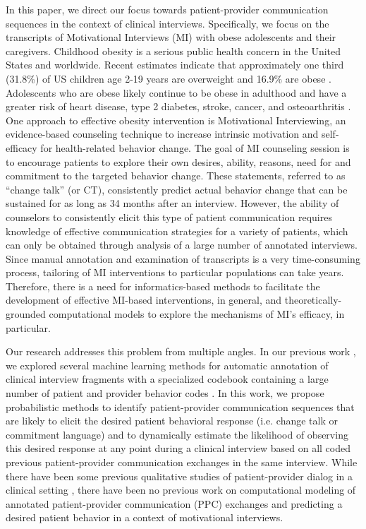 \documentclass{amia_summit_2018}
\begin{document}
In this paper, we direct our focus towards patient-provider communication sequences in the context of clinical interviews. Specifically, we focus on the transcripts of Motivational Interviews (MI) with obese adolescents and their caregivers. Childhood obesity is a serious public health concern in the United States and worldwide. Recent estimates indicate that approximately one third (31.8\%) of US children age 2-19 years are overweight and 16.9\% are obese \cite{ogden2012prevalence}. Adolescents who are obese likely continue to be obese in adulthood and have a greater risk of heart disease, type 2 diabetes, stroke, cancer, and osteoarthritis \cite{general2010surgeon}. One approach to effective obesity intervention is Motivational Interviewing, an evidence-based counseling technique to increase intrinsic motivation and self-efficacy for health-related behavior change. The goal of MI counseling session is to encourage patients to explore their own desires, ability, reasons, need for and commitment to the targeted behavior change. These statements, referred to as ``change talk'' (or CT), consistently predict actual behavior change that can be sustained for as long as 34 months after an interview. However, the ability of counselors to consistently elicit this type of patient communication requires knowledge of effective communication strategies for a variety of patients, which can only be obtained through analysis of a large number of annotated interviews. Since manual annotation and examination of transcripts is a very time-consuming process, tailoring of MI interventions to particular populations can take years. Therefore, there is a need for informatics-based methods to facilitate the development of effective MI-based interventions, in general, and theoretically-grounded computational models to explore the mechanisms of MI's efficacy, in particular.  

Our research addresses this problem from multiple angles. In our previous work \cite{kotov2015interpretable, hasan2016study}, we explored several machine learning methods for automatic annotation of clinical interview fragments with a specialized codebook containing a large number of patient and provider behavior codes \cite{carcone2013provider}. In this work, we propose probabilistic methods to identify patient-provider communication sequences that are likely to elicit the desired patient behavioral response (i.e. change talk or commitment language) and to dynamically estimate the likelihood of observing this desired response at any point during a clinical interview based on all coded previous patient-provider communication exchanges in the same interview. While there have been some previous qualitative studies of patient-provider dialog in a clinical setting \cite{eide2004physician}, there have been no previous work on computational modeling of annotated patient-provider communication (PPC) exchanges and predicting a desired patient behavior in a context of motivational interviews.   
\end{document}
